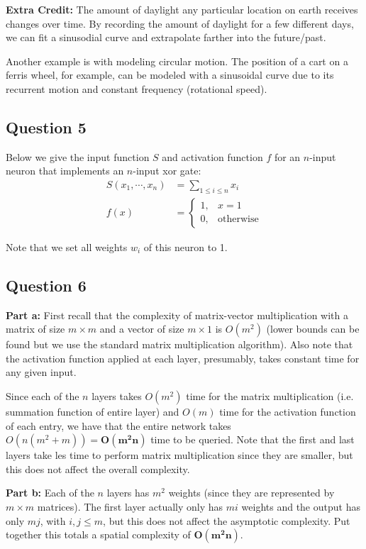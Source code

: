 \documentclass{article}
\begin{document}
\noindent\textbf{Extra Credit:} The amount of daylight any particular location on earth receives changes over time. By recording the amount of daylight for a few different days, we can fit a sinusodial curve and extrapolate farther into the future/past.

Another example is with modeling circular motion. The position of a cart on a ferris wheel, for example, can be modeled with a sinusoidal curve due to its recurrent motion and constant frequency (rotational speed).

\subsection*{Question 5}
Below we give the input function $S$ and activation function $f$ for an $n$-input neuron that implements an $n$-input xor gate:
\begin{align*}
  S(x_1,\cdots,x_n)&=\sum_{1\le i\le n}x_i\\
  f(x)&=\begin{cases}
    1,&x=1\\
    0,&\text{otherwise}
  \end{cases}
\end{align*}

Note that we set all weights $w_i$ of this neuron to 1.


\subsection*{Question 6}
\noindent\textbf{Part a:} First recall that the complexity of matrix-vector multiplication with a matrix of size $m\times m$ and a vector of size $m\times1$ is $O(m^2)$ (lower bounds can be found but we use the standard matrix multiplication algorithm). Also note that the activation function applied at each layer, presumably, takes constant time for any given input.

Since each of the $n$ layers takes $O(m^2)$ time for the matrix multiplication (i.e. summation function of entire layer) and $O(m)$ time for the activation function of each entry, we have that the entire network takes $O(n(m^2+m))=\mathbf{O(m^2n)}$ time to be queried. Note that the first and last layers take les time to perform matrix multiplication since they are smaller, but this does not affect the overall complexity.
\bigskip

\noindent\textbf{Part b:} Each of the $n$ layers has $m^2$ weights (since they are represented by $m\times m$ matrices). The first layer actually only has $mi$ weights and the output has only $mj$, with $i,j\le m$, but this does not affect the asymptotic complexity. Put together this totals a spatial complexity of $\mathbf{O(m^2n)}$.
\end{document}
